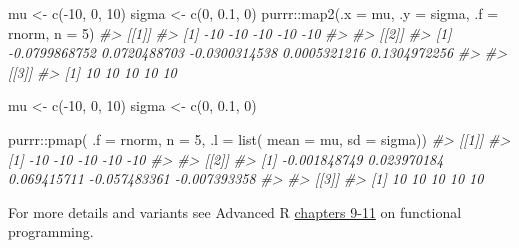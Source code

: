 \documentclass[
  12pt,
]{book}
\newenvironment{Shaded}{\begin{snugshade}}{\end{snugshade}}
\newcommand{\AttributeTok}[1]{\textcolor[rgb]{0.77,0.63,0.00}{#1}}
\newcommand{\CommentTok}[1]{\textcolor[rgb]{0.56,0.35,0.01}{\textit{#1}}}
\newcommand{\DecValTok}[1]{\textcolor[rgb]{0.00,0.00,0.81}{#1}}
\newcommand{\FloatTok}[1]{\textcolor[rgb]{0.00,0.00,0.81}{#1}}
\newcommand{\FunctionTok}[1]{\textcolor[rgb]{0.00,0.00,0.00}{#1}}
\newcommand{\NormalTok}[1]{#1}
\newcommand{\OtherTok}[1]{\textcolor[rgb]{0.56,0.35,0.01}{#1}}
\newcommand{\SpecialCharTok}[1]{\textcolor[rgb]{0.00,0.00,0.00}{#1}}
\begin{document}
\begin{Shaded}
\begin{Highlighting}[]
\NormalTok{mu }\OtherTok{\textless{}{-}} \FunctionTok{c}\NormalTok{(}\SpecialCharTok{{-}}\DecValTok{10}\NormalTok{, }\DecValTok{0}\NormalTok{, }\DecValTok{10}\NormalTok{)}
\NormalTok{sigma }\OtherTok{\textless{}{-}} \FunctionTok{c}\NormalTok{(}\DecValTok{0}\NormalTok{, }\FloatTok{0.1}\NormalTok{, }\DecValTok{0}\NormalTok{)}
\NormalTok{purrr}\SpecialCharTok{::}\FunctionTok{map2}\NormalTok{(}\AttributeTok{.x =}\NormalTok{ mu, }\AttributeTok{.y =}\NormalTok{ sigma, }\AttributeTok{.f =}\NormalTok{ rnorm, }\AttributeTok{n =} \DecValTok{5}\NormalTok{)}
\CommentTok{\#\textgreater{} [[1]]}
\CommentTok{\#\textgreater{} [1] {-}10 {-}10 {-}10 {-}10 {-}10}
\CommentTok{\#\textgreater{} }
\CommentTok{\#\textgreater{} [[2]]}
\CommentTok{\#\textgreater{} [1] {-}0.0799868752  0.0720488703 {-}0.0300314538  0.0005321216  0.1304972256}
\CommentTok{\#\textgreater{} }
\CommentTok{\#\textgreater{} [[3]]}
\CommentTok{\#\textgreater{} [1] 10 10 10 10 10}
\end{Highlighting}
\end{Shaded}

\begin{Shaded}
\begin{Highlighting}[]
\NormalTok{mu }\OtherTok{\textless{}{-}} \FunctionTok{c}\NormalTok{(}\SpecialCharTok{{-}}\DecValTok{10}\NormalTok{, }\DecValTok{0}\NormalTok{, }\DecValTok{10}\NormalTok{)}
\NormalTok{sigma }\OtherTok{\textless{}{-}} \FunctionTok{c}\NormalTok{(}\DecValTok{0}\NormalTok{, }\FloatTok{0.1}\NormalTok{, }\DecValTok{0}\NormalTok{)}

\NormalTok{purrr}\SpecialCharTok{::}\FunctionTok{pmap}\NormalTok{(}
  \AttributeTok{.f =}\NormalTok{ rnorm, }
  \AttributeTok{n =} \DecValTok{5}\NormalTok{,}
  \AttributeTok{.l =} \FunctionTok{list}\NormalTok{(}
    \AttributeTok{mean =}\NormalTok{ mu, }
    \AttributeTok{sd =}\NormalTok{ sigma))}
\CommentTok{\#\textgreater{} [[1]]}
\CommentTok{\#\textgreater{} [1] {-}10 {-}10 {-}10 {-}10 {-}10}
\CommentTok{\#\textgreater{} }
\CommentTok{\#\textgreater{} [[2]]}
\CommentTok{\#\textgreater{} [1] {-}0.001848749  0.023970184  0.069415711 {-}0.057483361 {-}0.007393358}
\CommentTok{\#\textgreater{} }
\CommentTok{\#\textgreater{} [[3]]}
\CommentTok{\#\textgreater{} [1] 10 10 10 10 10}
\end{Highlighting}
\end{Shaded}

For more details and variants see Advanced R \href{https://adv-r.hadley.nz/functionals.html}{chapters 9-11} on functional programming.
\end{document}

